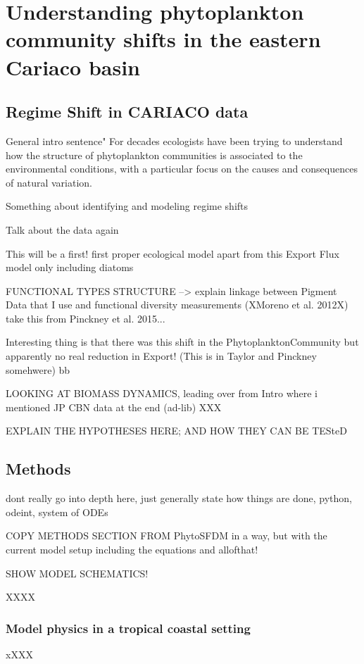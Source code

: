 \chapter{Understanding phytoplankton community shifts in the eastern Cariaco basin}

\small {\textbf{}}


\normalsize
\section{Regime Shift in CARIACO data}
General intro sentence" For decades ecologists have been trying to understand how the structure of phytoplankton communities is associated to the environmental conditions, with a particular focus on the causes and consequences of natural variation.

Something about identifying and modeling regime shifts

Talk about the data again

This will be a first! first proper ecological model apart from this Export Flux model only including diatoms \citep{Walsh2002a}


FUNCTIONAL TYPES STRUCTURE --> explain linkage between Pigment Data that I use and functional diversity measurements (XMoreno et al. 2012X) take this from Pinckney et al. 2015...

Interesting thing is that there was this shift in the PhytoplanktonCommunity but apparently no real reduction in Export! (This is in Taylor and Pinckney somehwere)
bb


LOOKING AT BIOMASS DYNAMICS, leading over from Intro where i mentioned JP CBN data at the end (ad-lib)
XXX

EXPLAIN THE HYPOTHESES HERE; AND HOW THEY CAN BE TESteD

\section{Methods}


dont really go into depth here, just generally state how things are done, python, odeint, system of ODEs

COPY METHODS SECTION FROM PhytoSFDM in a way, but with the current model setup
including the equations and allofthat!

SHOW MODEL SCHEMATICS!

XXXX

\subsection{Model physics in a tropical coastal setting}
xXXX

